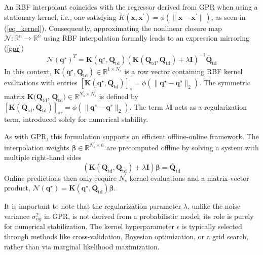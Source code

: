 \documentclass[preprint,10pt]{elsarticle}
\begin{document}
An RBF interpolant coincides with the regressor derived from GPR when using a stationary kernel, i.e., one satisfying $K(\mathbf{x}, \mathbf{x}^\prime) = \phi(\|\mathbf{x} - 
\mathbf{x}^\prime\|)$, as seen in (\ref{eq_kernel}). Consequently, approximating the nonlinear closure map $\mathcal{N}: \mathbb{R}^n \to \mathbb{R}^{\bar{n}}$ using RBF 
interpolation formally leads to an expression mirroring (\ref{gpr})
\begin{equation*}
	\label{eq:deterministic_RBF}
	\mathcal{N}(\mathbf{q}^\star)^T = \mathbf{K}(\mathbf{q}^\star, \mathbf{Q}_{\text{td}}) \left(\mathbf{K}(\mathbf{Q}_{\text{td}}, \mathbf{Q}_{\text{td}}) 
	+ \lambda \mathbf{I}\right)^{-1} \overline{\mathbf{Q}}_{\text{td}}
\end{equation*}
In this context, $\mathbf{K}\left(\mathbf{q}^\star, \mathbf{Q}_{\text{td}}\right) \in \mathbb{R}^{1 \times N_s^\prime}$ is a row
vector containing RBF kernel evaluations with entries $[\mathbf{K}\left (\mathbf{q}^\star, \mathbf{Q}_\text{td}\right )]_s = \phi(\|\mathbf{q}^\star - \mathbf{q}^s\|_2)$. The symmetric matrix $\mathbf{K}(\mathbf{Q}_{\text{td}}$, $\mathbf{Q}_{\text{td}}) \in \mathbb{R}^{N_s^\prime \times N_s^\prime}$ is defined by $[\mathbf{K}(\mathbf{Q}_{\text{td}}, \mathbf{Q}_{\text{td}})]_{sr} = \phi(\|\mathbf{q}^s - \mathbf{q}^r\|_2)$. The term $\lambda \mathbf{I}$ acts as a regularization term, introduced solely 
for numerical stability.

As with GPR, this formulation supports an efficient offline-online framework. The interpolation weights $\boldsymbol{\beta} \in \mathbb{R}^{N_s^\prime \times \bar{n}}$ are 
precomputed offline by solving a system with multiple right-hand sides
\begin{equation*}
	\left(\mathbf{K}(\mathbf{Q}_{\text{td}}, \mathbf{Q}_{\text{td}}) + \lambda \mathbf{I}\right) \boldsymbol{\beta} = \overline{\mathbf{Q}}_{\text{td}}
\end{equation*}
Online predictions then only require $N_s^\prime$ kernel evaluations and a matrix-vector product, $\mathcal{N}(\mathbf{q}^\star) = \mathbf{K}(\mathbf{q}^\star, 
\mathbf{Q}_{\text{td}}) \boldsymbol{\beta}$.

It is important to note that the regularization parameter $\lambda$, unlike the noise variance $\sigma_{ng}^2$ in GPR, is not derived from a probabilistic model; its role is purely 
for numerical stabilization. The kernel hyperparameter $\epsilon$ is typically selected through methods like cross-validation, Bayesian optimization, or a grid search, 
rather than via marginal likelihood maximization.
\end{document}
